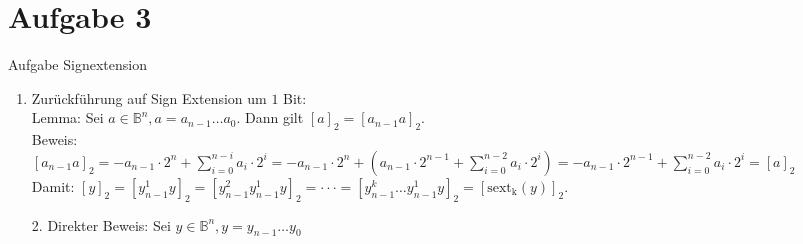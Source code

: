 
\section{Aufgabe 3}

\setcounter{exercise}{1}

\begin{frame}[allowframebreaks]{Aufgabe \thesection}{Signextension}
  \begin{solutionnoinc}
    \begin{enumerate}
      \item \alert{Zurückführung auf Sign Extension um $1$ Bit:}\\
        \tiny 
        \alert{Lemma:} Sei $a\in\mathbb{B}^n, a = a_{n-1}\ldots a_0$. Dann gilt $[a]_2 = [a_{n-1}a]_2$.\\
        Beweis:\\
        $\displaystyle[a_{n-1}a]_{2}=-a_{n-1}\cdot2^{n}+\sum_{i=0}^{n-i}a_{i}\cdot2^{i}=-a_{n-1}\cdot2^{n}+\left(a_{n-1}\cdot2^{n-1}+\sum_{i=0}^{n-2}a_{i}\cdot2^{i}\right)=-a_{n-1}\cdot2^{n-1}+\sum_{i=0}^{n-2}a_{i}\cdot2^{i}=\left[a\right]_2$\\
        Damit: $[y]_{2}=[y_{n-1}^{1}y]_{2}=[y_{n-1}^{2}y_{n-1}^{1}y]_{2}=\cdot\cdot\cdot=[y_{n-1}^{k}\ldots y_{n-1}^{1}y]_{2}=[\mathrm{sext_{k}}(y)]_{2}.$
    \end{enumerate}
  \end{solutionnoinc}
  \begin{solution}
    \begin{enumerate}
      \item[2.] \alert{Direkter Beweis:}
        \tiny
        Sei $y\in\mathbb{B}^n, y=y_{n-1}\ldots y_0$


\end{enumerate}
\end{solution}
\end{frame}
